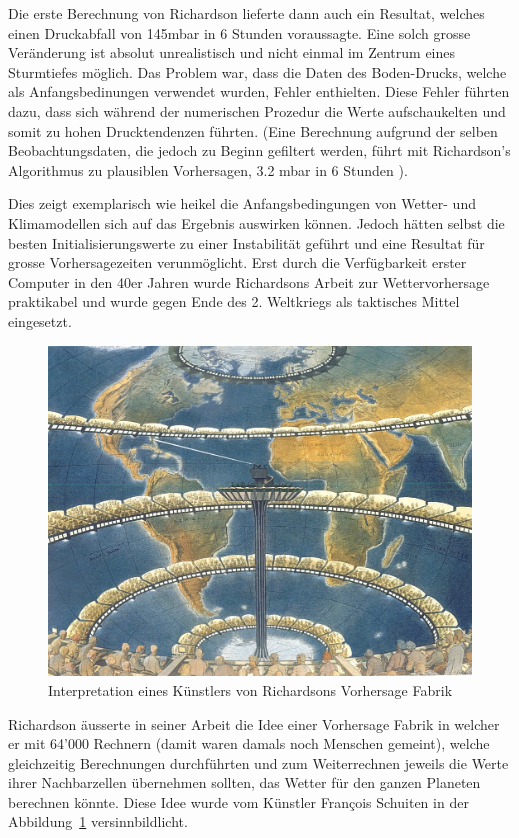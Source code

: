 \begin{refsection}
Die erste Berechnung von Richardson lieferte dann auch ein Resultat, welches einen Druckabfall von 145mbar in 6 Stunden voraussagte. Eine solch grosse Veränderung ist absolut unrealistisch und nicht einmal im Zentrum eines Sturmtiefes möglich. Das Problem war, dass die Daten des Boden-Drucks, welche als Anfangsbedinungen verwendet wurden, Fehler enthielten. Diese Fehler führten dazu, dass sich während der numerischen Prozedur die Werte aufschaukelten und somit zu hohen Drucktendenzen führten. (Eine Berechnung aufgrund der selben Beobachtungsdaten, die jedoch zu Beginn gefiltert werden, führt mit Richardson's Algorithmus zu plausiblen Vorhersagen, 3.2 mbar in 6 Stunden \cite{klima:stocker}).

Dies zeigt exemplarisch wie heikel die Anfangsbedingungen von Wetter- und Klimamodellen sich auf das Ergebnis auswirken können. Jedoch hätten selbst die besten Initialisierungswerte zu einer Instabilität geführt und eine Resultat für grosse Vorhersagezeiten verunmöglicht. Erst durch die Verfügbarkeit erster Computer in den 40er Jahren wurde Richardsons Arbeit zur  Wettervorhersage praktikabel und wurde gegen Ende des 2. Weltkriegs als taktisches Mittel eingesetzt.

\begin{figure}
\centering
\includegraphics{klima/64000.jpg}
\caption{Interpretation eines Künstlers von Richardsons Vorhersage Fabrik \cite{klima:biography}
\label{klima:geschichte:richardson}}
\end{figure}

Richardson äusserte in seiner Arbeit die Idee einer Vorhersage Fabrik in welcher er mit 64'000 Rechnern (damit waren damals noch Menschen gemeint), welche gleichzeitig Berechnungen durchführten und zum Weiterrechnen jeweils die Werte ihrer Nachbarzellen übernehmen sollten, das Wetter für den ganzen Planeten berechnen könnte. Diese Idee wurde vom Künstler François Schuiten in der Abbildung~\ref{klima:geschichte:richardson} versinnbildlicht.


\end{refsection}
